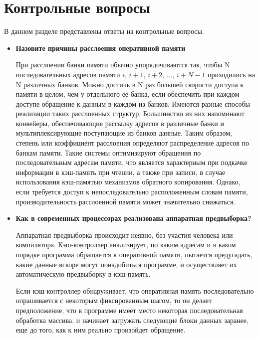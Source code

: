 \chapter{Контрольные вопросы}

В данном разделе представлены ответы на контрольные вопросы.

\noindent
\begin{itemize}[left=-0.5\parindent]
    \item \textbf{Назовите причины расслоения оперативной памяти}

        При расслоении банки памяти обычно упорядочиваются так, чтобы N
        последовательных адресов памяти $i$, $i+1$, $i+2$, ..., $i + N-1$
        приходились на N различных банков. Можно достичь в N раз большей
        скорости доступа к памяти в целом, чем у отдельного ее банка, если
        обеспечить при каждом доступе обращение к данным в каждом из банков.
        Имеются разные способы реализации таких расслоенных структур.
        Большинство из них напоминают конвейеры, обеспечивающие рассылку
        адресов в различные банки и мультиплексирующие поступающие из банков
        данные. Таким образом, степень или коэффициент расслоения определяют
        распределение адресов по банкам памяти. Такие системы оптимизируют
        обращения по последовательным адресам памяти, что является характерным
        при подкачке информации в кэш-память при чтении, а также при записи, в
        случае использования кэш-памятью механизмов обратного копирования.
        Однако, если требуется доступ к непоследовательно расположенным словам
        памяти, производительность расслоенной памяти может значительно
        снижаться.
        ~\\

    \item \textbf{Как в современных процессорах реализована аппаратная
                 предвыборка?}

        Аппаратная предвыборка происходит неявно, без участия человека или
        компилятора. Кэш-контроллер анализирует, по каким адресам и в каком
        порядке программа обращается к оперативной памяти, пытается
        предугадать, какие данные вскоре могут понадобиться программе, и
        осуществляет их автоматическую предвыборку в кэш-память.

        Если кэш-контроллер обнаруживает, что оперативная память
        последовательно опрашивается с некоторым фиксированным шагом, то он
        делает предположение, что в программе имеет место некоторая
        последовательная обработка массива, и начинает загружать следующие
        блоки данных заранее, еще до того, как к ним реально произойдет
        обращение.


\end{itemize}
